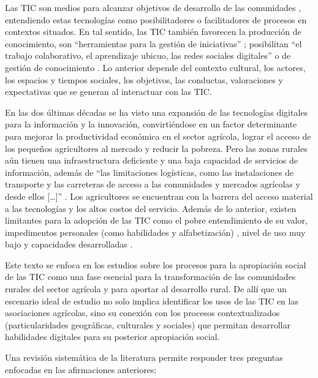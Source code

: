 \documentclass[spanish]{textolivre}
\begin{document}
Las TIC son medios para alcanzar objetivos de desarrollo de las comunidades \cite{paulhiac_perez_uso_2019,duarte_metodologipara_2014,castro_hidalgo_impacto_2014,barbosa_trigos_propuesta_2016}, entendiendo estas tecnologías como posibilitadores o facilitadores de procesos en contextos situados. En tal sentido, las TIC también favorecen la producción de conocimiento, son “herramientas para la gestión de iniciativas” \cite[p.~40]{duarte_metodologipara_2014}; posibilitan “el trabajo colaborativo, el aprendizaje ubicuo, las redes sociales digitales” \cite[p.~4-5]{santini_uso_2017} o de gestión de conocimiento \cite{santini_uso_2018}. Lo anterior depende del contexto cultural, los actores, los espacios y tiempos sociales, los objetivos, las conductas, valoraciones y expectativas \cite{sanchez_davila_nuevas_2018} que se generan al interactuar con las TIC. 

En las dos últimas décadas se ha visto una expansión de las tecnologías digitales para la información y la innovación, convirtiéndose en un factor determinante para mejorar la productividad económica en el sector agrícola, lograr el acceso de los pequeños agricultores al mercado y reducir la pobreza. Pero las zonas rurales aún tienen una infraestructura deficiente y una baja capacidad de servicios de información, además de “las limitaciones logísticas, como las instalaciones de transporte y las carreteras de acceso a las comunidades y mercados agrícolas y desde ellos […]” \cite[p.~47]{owusu_smallholder_2017}. Los agricultores se encuentran con la barrera del acceso material a las tecnologías y los altos costos del servicio. Además de lo anterior, existen limitantes para la adopción de las TIC como el pobre entendimiento de su valor, impedimentos personales (como habilidades y alfabetización) \cite{matsenjwa_pro-poor_2019}, nivel de uso muy bajo y capacidades desarrolladas \cite{vong_empowering_2019}. 

Este texto se enfoca en los estudios sobre los procesos para la apropiación social de las TIC como una fase esencial para la transformación de las comunidades rurales del sector agrícola y para aportar al desarrollo rural. De allí que un escenario ideal de estudio no solo implica identificar los usos de las TIC en las asociaciones agrícolas, sino su conexión con los procesos contextualizados (particularidades geográficas, culturales y sociales) que permitan desarrollar habilidades digitales para su posterior apropiación social.

 Una revisión sistemática de la literatura permite responder tres preguntas enfocadas en las afirmaciones anteriores:
\end{document}
